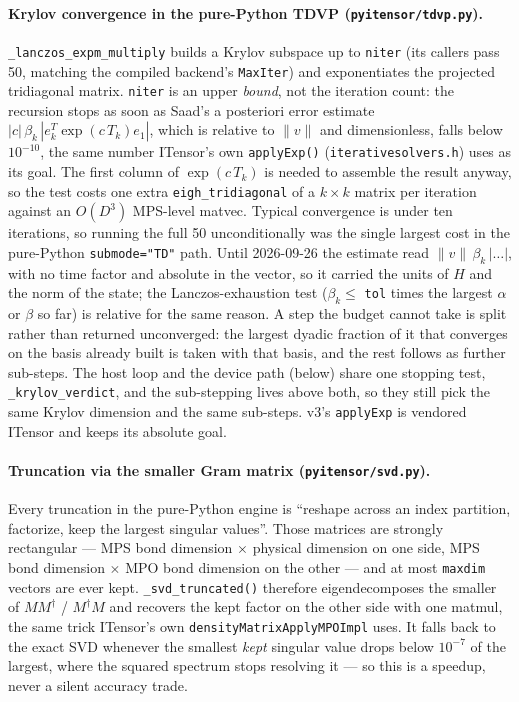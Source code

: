 \documentclass[11pt]{article}
\begin{document}
\paragraph{Krylov convergence in the pure-Python TDVP
(\texttt{pyitensor/tdvp.py}).} \texttt{\_lanczos\_expm\_multiply} builds a
Krylov subspace up to \texttt{niter} (its callers pass 50, matching the
compiled backend's \texttt{MaxIter}) and exponentiates the projected
tridiagonal matrix. \texttt{niter} is an upper \emph{bound}, not the
iteration count: the recursion stops as soon as Saad's a posteriori
error estimate $|c|\,\beta_k\,|e_k^T \exp(c\,T_k)e_1|$, which is relative
to $\|v\|$ and dimensionless, falls below $10^{-10}$, the same number
ITensor's own \texttt{applyExp()} (\texttt{iterativesolvers.h}) uses as
its goal. The first column of $\exp(c\,T_k)$ is needed to assemble the
result anyway, so the test costs one extra \texttt{eigh\_tridiagonal} of a
$k\times k$ matrix per iteration against an $O(D^3)$ MPS-level matvec.
Typical convergence is under ten iterations, so running the full 50
unconditionally was the single largest cost in the pure-Python
\texttt{submode="TD"} path. Until 2026-09-26 the estimate read
$\|v\|\,\beta_k\,|\ldots|$, with no time factor and absolute in the
vector, so it carried the units of $H$ and the norm of the state; the
Lanczos-exhaustion test ($\beta_k\le$ \texttt{tol} times the largest
$\alpha$ or $\beta$ so far) is relative for the same reason. A step the
budget cannot take is split rather than returned unconverged: the largest
dyadic fraction of it that converges on the basis already built is taken
with that basis, and the rest follows as further sub-steps. The host loop
and the device path (below) share one stopping test,
\texttt{\_krylov\_verdict}, and the sub-stepping lives above both, so they
still pick the same Krylov dimension and the same sub-steps. v3's
\texttt{applyExp} is vendored ITensor and keeps its absolute goal.

\paragraph{Truncation via the smaller Gram matrix
(\texttt{pyitensor/svd.py}).} Every truncation in the pure-Python engine
is ``reshape across an index partition, factorize, keep the largest
singular values''. Those matrices are strongly rectangular --- MPS bond
dimension $\times$ physical dimension on one side, MPS bond dimension
$\times$ MPO bond dimension on the other --- and at most \texttt{maxdim}
vectors are ever kept. \texttt{\_svd\_truncated()} therefore
eigendecomposes the smaller of $MM^\dagger$ / $M^\dagger M$ and recovers
the kept factor on the other side with one matmul, the same trick
ITensor's own \texttt{densityMatrixApplyMPOImpl} uses. It falls back to
the exact SVD whenever the smallest \emph{kept} singular value drops below
$10^{-7}$ of the largest, where the squared spectrum stops resolving it
--- so this is a speedup, never a silent accuracy trade.
\end{document}
